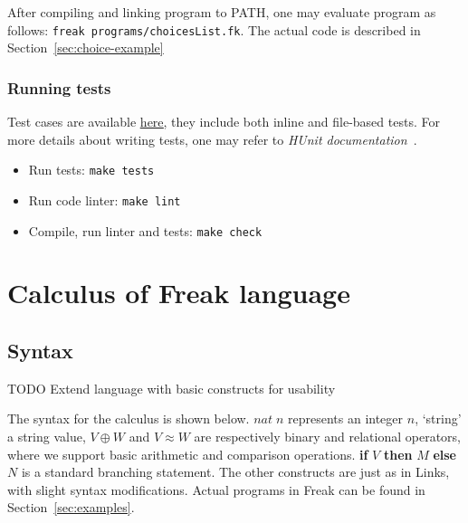 \documentclass[declaration,shortabstract]{iithesis}
\theoremstyle{definition} \newtheorem{definition}{Definition}[chapter]
\theoremstyle{remark} \newtheorem{remark}[definition]{Observation}
\theoremstyle{plain} \newtheorem{theorem}[definition]{Theorem}
\theoremstyle{plain} \newtheorem{lemma}[definition]{Lemma}
\begin{document}
    After compiling and linking program to PATH, one may evaluate program as
    follows: \verb!freak programs/choicesList.fk!. The actual code is described in Section~\ref{sec:choice-example}

    \subsection{Running tests}

    Test cases are available \href{https://github.com/Tomatosoup97/freak/blob/master/src/Tests.hs}{\underline{here}},
    they include both inline and file-based tests. For more details about
    writing tests, one may refer to \textit{HUnit documentation}~\cite{hunit-docs}.

    \begin{itemize}
        \item Run tests: \verb!make tests!
        \item Run code linter: \verb!make lint!
        \item Compile, run linter and tests: \verb!make check!
    \end{itemize}

\chapter{Calculus of Freak language}\label{chapter:calculus-of-freak-language}
\section{Syntax}

    \noindent
    TODO Extend language with basic constructs for usability

    The syntax for the calculus is shown below. $nat \; n$ represents an integer $n$,
    `string' a string value, $V \oplus W$ and $V \approx W$ are respectively
    binary and relational operators, where we support basic arithmetic and
    comparison operations. \textbf{if} $V$ \textbf{then} $M$ \textbf{else} $N$
    is a standard branching statement. The other constructs are just as in Links,
    with slight syntax modifications. Actual programs in Freak can be found in
    Section~\ref{sec:examples}.
\end{document}

